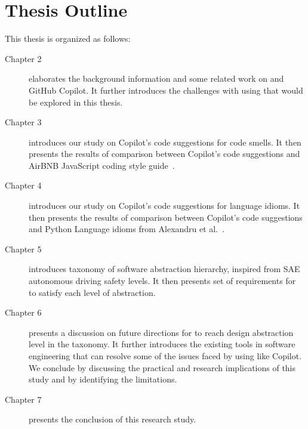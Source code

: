 \section{Thesis Outline}

This thesis is organized as follows:

\begin{description}
\item[Chapter 2] elaborates the background information and some related work on \cct{} and GitHub Copilot. It further introduces the challenges with using \cct{} that would be explored in this thesis.
\item[Chapter 3] introduces our study on Copilot's code suggestions for code smells. It then presents the results of comparison between Copilot's code suggestions and AirBNB JavaScript coding style guide~\cite{airbnb_code}.
\item[Chapter 4] introduces our study on Copilot's code suggestions for language idioms. It then presents the results of comparison between Copilot's code suggestions and Python Language idioms from Alexandru et al.~\cite{Alexandru2018}.
\item[Chapter 5] introduces taxonomy of software abstraction hierarchy, inspired from SAE autonomous driving safety levels. It then presents set of requirements for \cct{} to satisfy each level of abstraction.
\item[Chapter 6] presents a discussion on future directions for \cct{} to reach design abstraction level in the taxonomy. It further introduces the existing tools in software engineering that can resolve some of the issues faced by using \cct{} like Copilot. We conclude by discussing the practical and research implications of this study and by identifying the limitations.
\item[Chapter 7] presents the conclusion of this research study.
\end{description}


